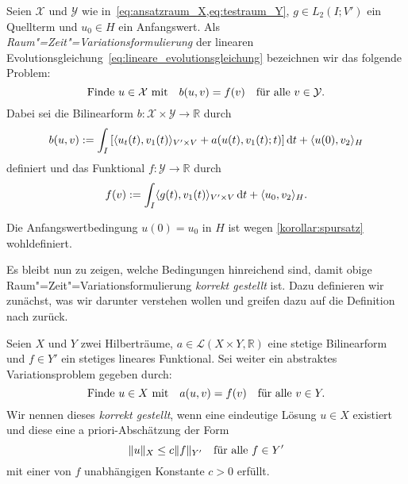\documentclass[../main.tex]{subfiles}
\begin{document}
\begin{Definition}
\label{definition:absktrakte_raum_zeit_formulierung}
    Seien $\mathcal X$ und $\mathcal Y$ wie in~\cref{eq:ansatzraum_X,eq:testraum_Y}, $g \in L_{2}(I; V')$ ein Quellterm und $u_{0} \in H$ ein Anfangswert.
    Als \emph{Raum"=Zeit"=Variationsformulierung} der linearen Evolutionsgleichung~\cref{eq:lineare_evolutionsgleichung} bezeichnen wir das folgende Problem:
    \begin{equation}
        \label{eq:absktrakte_raum_zeit_formulierung}
        \text{Finde } u \in \mathcal X \text{ mit} \quad b(u, v) = f(v) \quad \fa v \in \mathcal Y.
    \end{equation}
    Dabei sei die Bilinearform $b \colon \mathcal X \times \mathcal Y \to \mathbb{R}$ durch
    \begin{equation}
        \label{eq:absktrakte_raum_zeit_formulierung:lhs}
        b(u, v) := \int_{I} \left[   \skp{u_{t}(t)}{v_{1}(t)}{V' \times V} + a(u(t), v_{1}(t); t)  \right] \diff t + \skp{u(0)}{v_{2}}{H}
    \end{equation}
    definiert und das Funktional $f \colon \mathcal Y \to \mathbb{R}$ durch
    \begin{equation}
        \label{eq:absktrakte_raum_zeit_formulierung:rhs}
        f(v) := \int_{I} \skp{g(t)}{v_{1}(t)}{V' \times V} \diff t + \skp{u_{0}}{v_{2}}{H}.
    \end{equation}
\end{Definition}

\begin{Bemerkung}
    Die Anfangswertbedingung $u(0) = u_{0}$ in $H$ ist wegen \cref{korollar:spursatz} wohldefiniert.
\end{Bemerkung}

Es bleibt nun zu zeigen, welche Bedingungen hinreichend sind, damit obige Raum"=Zeit"=Variationsformulierung \emph{korrekt gestellt} ist.
Dazu definieren wir zunächst, was wir darunter verstehen wollen und greifen dazu auf die Definition nach \textcite{hadamard1902problemes} zurück.

\begin{Definition}[Hadamard]
\label{definition:sachgemaess_gestellt_nach_hadamard}
    Seien $X$ und $Y$ zwei Hilberträume, $a \in \mathcal L(X \times Y, \mathbb{R})$ eine stetige Bilinearform und $f \in Y'$ ein stetiges lineares Funktional.
    Sei weiter ein abstraktes Variationsproblem gegeben durch:
    \begin{equation}
    \label{eq:hadamard_variationsproblem}
        \text{Finde } u \in X \text{ mit} \quad a(u, v) = f(v) \quad \fa v \in Y.
    \end{equation}
    Wir nennen dieses \emph{korrekt gestellt}, wenn eine eindeutige Lösung $u \in X$ existiert und diese eine a priori-Abschätzung der Form
    \begin{equation}
    \label{eq:hadamard_abschaetzung}
        \norm{u}_{X} \leq c \norm{f}_{Y'} \quad \fa f \in Y'
    \end{equation}
    mit einer von $f$ unabhängigen Konstante $c > 0$ erfüllt.
\end{Definition}
\end{document}
